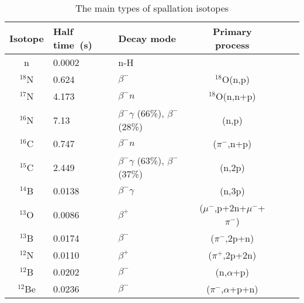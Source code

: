 \begin{table}[htbp]
	\centering
	\caption{The main types of spallation isotopes}
	\label{tab:solar_spallation_bkg}
	\begin{tabular}{cllccll}
		\toprule
		\textbf{Isotope} & \textbf{Half time~(\si{s})} & \textbf{Decay mode}                           & \textbf{Primary process}                   \\
		\midrule
		n                & 0.0002                      & n-H                                           &                                            \\
		$^{18}$N         & 0.624                       & $\beta^{-}$                                   & $^{18}$O(n,p)                              \\
		$^{17}$N         & 4.173                       & $\beta^{-}n$                                  & $^{18}$O(n,n+p)                            \\
		$^{16}$N         & 7.13                        & $\beta^{-}\gamma$ (66\%), $\beta^{-}$ (28\%)  & (n,p)                                      \\
		$^{16}$C         & 0.747                       & $\beta^{-}n$                                  & ($ \pi^{-} $,n+p)                          \\
		$^{15}$C         & 2.449                       & $\beta^{-}\gamma$ (63\%), $\beta^{-}$ (37\%)  & (n,2p)                                     \\
		$^{14}$B         & 0.0138                      & $\beta^{-}\gamma$                             & (n,3p)                                     \\
		$^{13}$O         & 0.0086                      & $\beta^{+}$                                   & ($ \mu^{-} $,p+2n+$ \mu^{-} $+$ \pi^{-} $) \\
		$^{13}$B         & 0.0174                      & $\beta^{-}$                                   & ($ \pi^{-} $,2p+n)                         \\
		$^{12}$N         & 0.0110                      & $\beta^{+}$                                   & ($ \pi^{+} $,2p+2n)                        \\
		$^{12}$B         & 0.0202                      & $\beta^{-}$                                   & (n,$ \alpha $+p)                           \\
		$^{12}$Be        & 0.0236                      & $\beta^{-}$                                   & ($ \pi^{-} $,$ \alpha $+p+n)               \\

\end{tabular}
\end{table}
